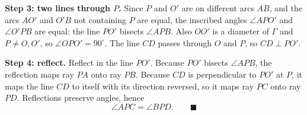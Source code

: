 \textbf{Step 3: two lines through $P$.} Since $P$ and $O'$ are on different arcs $AB$, and the arcs $AO'$ and $O'B$ not containing $P$ are equal, the inscribed angles $\angle APO'$ and $\angle O'PB$ are equal: the line $PO'$ bisects $\angle APB$. Also $OO'$ is a diameter of $\Gamma$ and $P\ne O,O'$, so $\angle OPO'=90^\circ$. The line $CD$ passes through $O$ and $P$, so $CD\perp PO'$.

\textbf{Step 4: reflect.} Reflect in the line $PO'$. Because $PO'$ bisects $\angle APB$, the reflection maps ray $PA$ onto ray $PB$. Because $CD$ is perpendicular to $PO'$ at $P$, it maps the line $CD$ to itself with its direction reversed, so it maps ray $PC$ onto ray $PD$. Reflections preserve angles, hence
\[
\angle APC=\angle BPD .\qquad\blacksquare
\]
